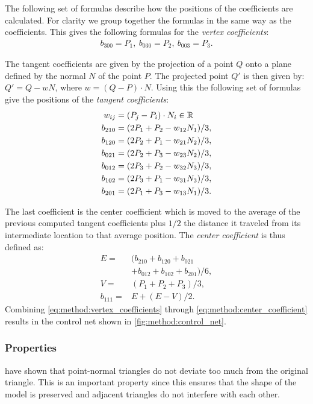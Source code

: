 The following set of formulas describe how the positions of the coefficients are calculated. For clarity we group together the formulas in the same way as the coefficients. This gives the following formulas for the \textit{vertex coefficients}:
\begin{align}\label{eq:method:vertex_coefficients}
	b_{300} = P_1,\ b_{030} = P_2,\ b_{003} = P_3.
\end{align}

The tangent coefficients are given by the projection of a point $Q$ onto a plane defined by the normal $N$ of the point $P$. The projected point $Q'$ is then given by: $Q' = Q - wN$, where $w = (Q - P) \cdot N$. Using this the following set of formulas give the positions of the \textit{tangent coefficients}:
\begin{align}\label{eq:method:tangent_coefficients}
	w_{ij} = {}& (P_j - P_i) \cdot N_i \in \mathbb{R} \nonumber\\
	b_{210} = {}& (2 P_1 + P_2 - w_{12}N_1) / 3,\nonumber\\
	b_{120} = {}& (2 P_2 + P_1 - w_{21}N_2) / 3,\nonumber\\
	b_{021} = {}& (2 P_2 + P_3 - w_{23}N_2) / 3, \\
	b_{012} = {}& (2 P_3 + P_2 - w_{32}N_3) / 3,\nonumber\\
	b_{102} = {}& (2 P_3 + P_1 - w_{31}N_3) / 3,\nonumber\\
	b_{201} = {}& (2 P_1 + P_3 - w_{13}N_1) / 3. \nonumber
\end{align}

The last coefficient is the center coefficient which is moved to the average of the previous computed tangent coefficients plus $1/2$ the distance it traveled from its intermediate location to that average position. The \textit{center coefficient} is thus defined as:
\begin{align}\label{eq:method:center_coefficient}
	E = {}& (b_{210} + b_{120} + b_{021} \nonumber \\
		{}& + b_{012} + b_{102} + b_{201}) / 6, \nonumber\\
	V = {}& (P_1 + P_2 + P_3) / 3, \\
	b_{111} = {}& E + (E - V) / 2. \nonumber
\end{align}
Combining \eqref{eq:method:vertex_coefficients} through \eqref{eq:method:center_coefficient} results in the control net shown in \cref{fig:method:control_net}.

\subsubsection{Properties}
\label{sss:method:geometric:properties}
\citeauthor{vlachos2001curved} have shown that point-normal triangles do not deviate too much from the original triangle. This is an important property since this ensures that the shape of the model is preserved and adjacent triangles do not interfere with each other. 

